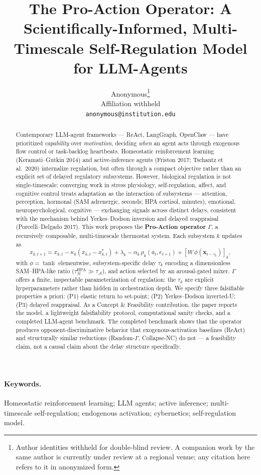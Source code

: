 \documentclass{article}
\title{The Pro-Action Operator: A Scientifically-Informed, Multi-Timescale Self-Regulation Model for LLM-Agents}
\author{%
  Anonymous\thanks{Author identities withheld for double-blind review. A companion work by the same author is currently under review at a regional venue; any citation here refers to it in anonymized form.} \\
  Affiliation withheld \\
  \texttt{anonymous@institution.edu}
}
\begin{document}
\maketitle

\begin{abstract}
Contemporary LLM-agent frameworks --- ReAct, LangGraph, OpenClaw --- have prioritized \textit{capability} over \textit{motivation}, deciding \textit{when} an agent acts through exogenous flow control or task-backlog heartbeats. Homeostatic reinforcement learning (Keramati--Gutkin 2014) and active-inference agents (Friston 2017; Tschantz et al.\ 2020) internalize regulation, but often through a compact objective rather than an explicit set of delayed regulatory subsystems. However, biological regulation is not single-timescale: converging work in stress physiology, self-regulation, affect, and cognitive control treats adaptation as the interaction of subsystems --- attention, perception, hormonal (SAM adrenergic, seconds; HPA cortisol, minutes), emotional, neuropsychological, cognitive --- exchanging signals across distinct delays, consistent with the mechanism behind Yerkes--Dodson inversion and delayed reappraisal (Porcelli--Delgado 2017). This work proposes the \textbf{Pro-Action operator} $\Gamma$, a recursively composable, multi-timescale thermostat system. Each subsystem $k$ updates as
\[
x_{k,t+1} = x_{k,t} - \kappa_k(x_{k,t}-x^{*}_{k,t}) + \lambda_k - \alpha_k\,\rho_k(a_t,e_{t+1}) + [W\,\phi(\mathbf{x}_{t-\tau_k})]_k,
\]
with $\phi=\tanh$ elementwise, subsystem-specific delay $\tau_k$ encoding a dimensionless SAM--HPA-like ratio ($\tau_{\mathcal{H}}^{\mathrm{HPA}} \gg \tau_{\mathcal{A}}$), and action selected by an arousal-gated mixer. $\Gamma$ offers a finite, inspectable parameterization of regulation: the $\tau_k$ are explicit hyperparameters rather than hidden in orchestration depth. We specify three falsifiable properties a priori: (P1) elastic return to set-point; (P2) Yerkes--Dodson inverted-U; (P3) delayed reappraisal. As a Concept \& Feasibility contribution, the paper reports the model, a lightweight falsifiability protocol, computational sanity checks, and a completed LLM-agent benchmark. The completed benchmark shows that the operator produces opponent-discriminative behavior that exogenous-activation baselines (ReAct) and structurally similar reductions (Random-$\Gamma$, Collapse-NC) do not --- a feasibility claim, not a causal claim about the delay structure specifically.
\end{abstract}

\paragraph{Keywords.}
Homeostatic reinforcement learning; LLM agents; active inference; multi-timescale self-regulation; endogenous activation; cybernetics; self-regulation model.
\end{document}
